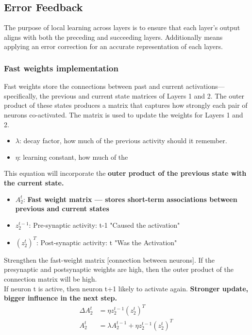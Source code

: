 \documentclass{article}
\begin{document}
\subsection{Error Feedback}
The purpose of local learning across layers is to ensure that each layer's output aligns with both the preceding and succeeding layers. Additionally means applying an error correction for an accurate representation of each layers. 

\subsubsection{Fast weights implementation}
\hspace{.5cm}Fast weights store the connections between past and current activations—specifically, the previous and current state matrices of Layers 1 and 2. The outer product of these states produces a matrix that captures how strongly each pair of neurons co-activated. The matrix is used to update the weights for Layers 1 and 2. 
\begin{itemize}
    \item $\lambda$: decay factor, how much of the previous activity should it remember. 
    \item $\eta$: learning constant, how much of the 
\end{itemize}
This equation will incorporate the \textbf{outer product of the previous state with the current state.} \\
\begin{itemize}
    \item $A^t_2$: \textbf{Fast weight matrix — stores short-term associations between previous and current states}
    \item $z^{t-1}_2$: Pre-synaptic activity: t-1 "Caused the activation"
    \item $(z^t_2)^T$: Post-synaptic activity: t "Was the Activation"
\end{itemize}
Strengthen the fast-weight matrix [connection between neurons]. If the presynaptic and postsynaptic weights are high, then the outer product of the connection matrix will be high. \\
If neuron t is active, then neuron t+1 likely to activate again. \textbf{Stronger update, bigger influence in the next step. }
\begin{align}
\Delta A_2^t &= \eta z^{t-1}_2(z^t_2)^T \\
A_2^t &= \lambda A^{t-1}_2 + \eta z^{t-1}_2(z^t_2)^T \\
\end{align}
\end{document}
